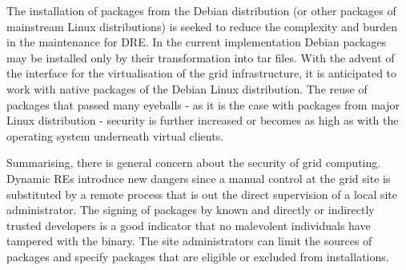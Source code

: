 The installation of packages from the Debian distribution (or other
packages of mainstream Linux distributions) is seeked to reduce the
complexity and burden in the maintenance for DRE. In the
current implementation Debian packages may be installed only by their
transformation into tar files. With the advent of the interface for
the virtualisation of the grid infrastructure, it is anticipated to
work with native packages of the Debian Linux distribution. The reuse
of packages that passed many eyeballs - as it is the case with packages
from major Linux distribution - security is further increased or becomes
as high as with the operating system underneath virtual clients.

Summarising, there is general concern about the security of grid
computing.  Dynamic REs introduce new dangers since a
manual control at the grid site is substituted by a remote process that
is out the direct supervision of a local site administrator. The signing
of packages by known and directly or indirectly trusted developers is
a good indicator that no malevolent individuals have tampered with the
binary. The site administrators can limit the sources of packages and
specify packages that are eligible or excluded from installations.



% 